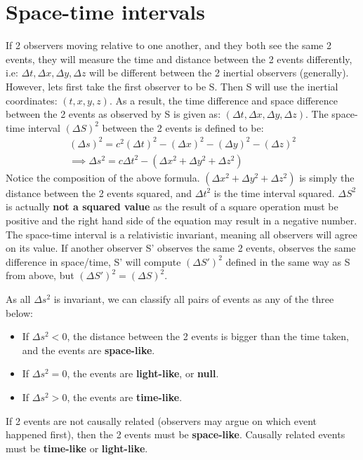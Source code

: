 \documentclass[10pt]{report}
\begin{document}
{\section{Space-time intervals}
\par{If 2 observers moving relative to one another, and they both see the same 2 events, they will measure the time and distance between the 2 events differently, i.e: $\Delta t, \Delta x, \Delta y, \Delta z$ will be different between the 2 inertial observers (generally). However, lets first take the first observer to be S. Then  S will use the inertial coordinates: $\left(t,x,y,z\right)$. As a result, the time difference and space difference between the 2 events as observed by S is given as: $\left(\Delta t, \Delta x,\Delta y, \Delta z\right)$. The space-time interval $\left(\Delta S\right)^{2}$ between the 2 events is defined to be:  
\begin{align*}
\left(\Delta s\right)^{2}=c^{2}\left(\Delta t\right)^{2}-\left(\Delta x\right)^{2}-\left(\Delta y\right)^{2}-\left(\Delta z\right)^{2} \\
\implies\Delta s^{2}=c\Delta t^{2}-\left(\Delta x^{2}+\Delta y^{2}+\Delta z^{2}\right)
\end{align*}
Notice the composition of the above formula. $\left(\Delta x^{2}+\Delta y^{2}+\Delta z^{2}\right)$ is simply the distance between the 2 events squared, and $\Delta t^{2}$ is the time interval squared. $\Delta S^{2}$ is actually \textbf{not a squared value} as the result of a square operation must be positive and the right hand side of the equation may result in a negative number. The space-time interval is a relativistic invariant, meaning all observers will agree on its value. If another observer S' observes the same 2 events, observes the same difference in space/time, S' will compute $\left(\Delta S'\right)^{2}$ defined in the same way as S from above, but $\left(\Delta S'\right)^{2}=\left(\Delta S\right)^{2}$.
}
\par{As all $\Delta s^{2}$ is invariant, we can classify all pairs of events as any of the three below:
	\begin{itemize}
		\item{If $\Delta s^{2}<0$, the distance between the 2 events is bigger than the time taken, and the events are \textbf{space-like}.}
		\item{If $\Delta s^{2}=0$, the events are \textbf{light-like}, or \textbf{null}.}
		\item{If $\Delta s^{2}>0$, the events are \textbf{time-like}.}
	\end{itemize}
If 2 events are not causally related (observers may argue on which event happened first), then the 2 events must be \textbf{space-like}. Causally related events must be \textbf{time-like} or \textbf{light-like}.

}}
\end{document}
